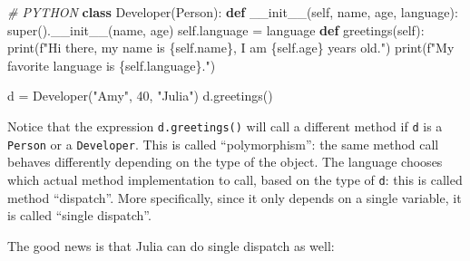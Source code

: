 \documentclass[11pt]{article}
\newenvironment{Shaded}{}{}
\newcommand{\KeywordTok}[1]{\textcolor[rgb]{0.00,0.44,0.13}{\textbf{{#1}}}}
\newcommand{\DecValTok}[1]{\textcolor[rgb]{0.25,0.63,0.44}{{#1}}}
\newcommand{\StringTok}[1]{\textcolor[rgb]{0.25,0.44,0.63}{{#1}}}
\newcommand{\CommentTok}[1]{\textcolor[rgb]{0.38,0.63,0.69}{\textit{{#1}}}}
\newcommand{\FunctionTok}[1]{\textcolor[rgb]{0.02,0.16,0.49}{{#1}}}
\newcommand{\NormalTok}[1]{{#1}}
\newcommand{\SpecialCharTok}[1]{\textcolor[rgb]{0.25,0.44,0.63}{{#1}}}
\newcommand{\SpecialStringTok}[1]{\textcolor[rgb]{0.73,0.40,0.53}{{#1}}}
\newcommand{\VariableTok}[1]{\textcolor[rgb]{0.10,0.09,0.49}{{#1}}}
\newcommand{\OperatorTok}[1]{\textcolor[rgb]{0.40,0.40,0.40}{{#1}}}
\newcommand{\BuiltInTok}[1]{{#1}}
\begin{document}
\begin{Shaded}
\begin{Highlighting}[]
\CommentTok{\# PYTHON}
\KeywordTok{class}\NormalTok{ Developer(Person):}
    \KeywordTok{def} \FunctionTok{\_\_init\_\_}\NormalTok{(}\VariableTok{self}\NormalTok{, name, age, language):}
        \BuiltInTok{super}\NormalTok{().}\FunctionTok{\_\_init\_\_}\NormalTok{(name, age)}
        \VariableTok{self}\NormalTok{.language }\OperatorTok{=}\NormalTok{ language}
    \KeywordTok{def}\NormalTok{ greetings(}\VariableTok{self}\NormalTok{):}
        \BuiltInTok{print}\NormalTok{(}\SpecialStringTok{f"Hi there, my name is }\SpecialCharTok{\{}\VariableTok{self}\SpecialCharTok{.}\NormalTok{name}\SpecialCharTok{\}}\SpecialStringTok{, I am }\SpecialCharTok{\{}\VariableTok{self}\SpecialCharTok{.}\NormalTok{age}\SpecialCharTok{\}}\SpecialStringTok{ years old."}\NormalTok{)}
        \BuiltInTok{print}\NormalTok{(}\SpecialStringTok{f"My favorite language is }\SpecialCharTok{\{}\VariableTok{self}\SpecialCharTok{.}\NormalTok{language}\SpecialCharTok{\}}\SpecialStringTok{."}\NormalTok{)}

\NormalTok{d }\OperatorTok{=}\NormalTok{ Developer(}\StringTok{"Amy"}\NormalTok{, }\DecValTok{40}\NormalTok{, }\StringTok{"Julia"}\NormalTok{)}
\NormalTok{d.greetings()}
\end{Highlighting}
\end{Shaded}

    Notice that the expression \texttt{d.greetings()} will call a different
method if \texttt{d} is a \texttt{Person} or a \texttt{Developer}. This
is called ``polymorphism'': the same method call behaves differently
depending on the type of the object. The language chooses which actual
method implementation to call, based on the type of \texttt{d}: this is
called method ``dispatch''. More specifically, since it only depends on
a single variable, it is called ``single dispatch''.

The good news is that Julia can do single dispatch as well:
\end{document}
